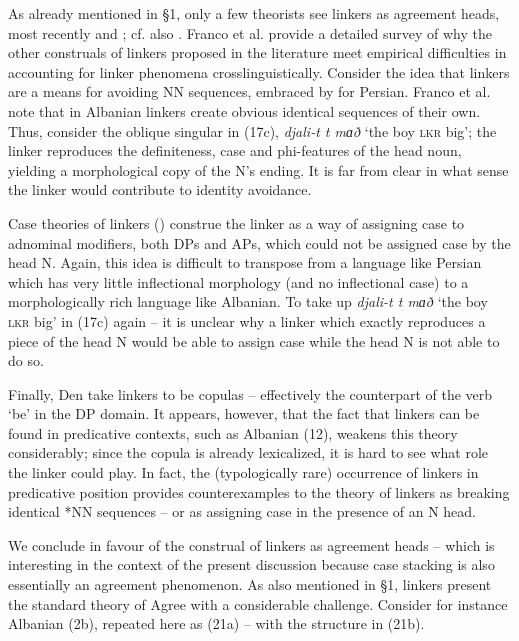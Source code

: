 \documentclass[output=paper]{langsci/langscibook}
\begin{document}
As already mentioned in §1, only a few theorists see linkers as agreement heads, most recently \citet{Philip2012} and \citet{Franco2015}; cf. also \citet{Zwart2006}. Franco et al. provide a detailed survey of why the other construals of linkers proposed in the literature meet empirical difficulties in accounting for linker phenomena crosslinguistically. Consider the idea that linkers are a means for avoiding NN sequences, embraced by \citet{Richards2010} for Persian. Franco et al. note that in Albanian linkers create obvious identical sequences of their own. Thus, consider the oblique singular in (17c), \textit{djali-t t mɑð} ‘the boy \textsc{lkr} big’; the linker reproduces the definiteness, case and phi-features of the head noun, yielding a morphological copy of the N’s ending. It is far from clear in what sense the linker would contribute to identity avoidance.

  Case theories of linkers (\citealt{Larson2008}) construe the linker as a way of assigning case to adnominal modifiers, both DPs and APs, which could not be assigned case by the head N. Again, this idea is difficult to transpose from a language like Persian which has very little inflectional morphology (and no inflectional case) to a morphologically rich language like Albanian. To take up \textit{djali-t t mɑð} ‘the boy \textsc{lkr} big’ in (17c) again – it is unclear why a linker which exactly reproduces a piece of the head N would be able to assign case while the head N is not able to do so.    

  Finally, Den \citet{Dikken2004} take linkers to be copulas – effectively the counterpart of the verb ‘be’ in the DP domain. It appears, however, that the fact that linkers can be found in predicative contexts, such as Albanian (12), weakens this theory considerably; since the copula is already lexicalized, it is hard to see what role the linker could play. In fact, the (typologically rare) occurrence of linkers in predicative position provides counterexamples to the theory of linkers as breaking identical *NN sequences – or as assigning case in the presence of an N head. 

  We conclude in favour of the construal of linkers as agreement heads – which is interesting in the context of the present discussion because case stacking is also essentially an agreement phenomenon. As also mentioned in §1, linkers present the standard theory of Agree with a considerable challenge. Consider for instance Albanian (2b), repeated here as (21a) – with the structure in (21b).
\end{document}
